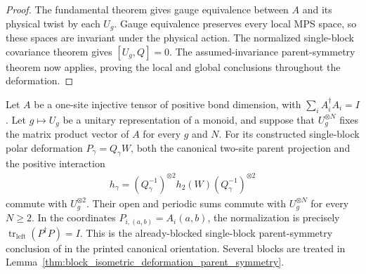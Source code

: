 \begin{proof}
    \leanok
    The fundamental theorem gives gauge equivalence between $A$ and
    its physical twist by each $U_g$. Gauge equivalence preserves every
    local MPS space, so these spaces are invariant under the physical
    action. The normalized single-block covariance theorem gives
    $[U_g,Q]=0$. The assumed-invariance parent-symmetry theorem now
    applies, proving the local and global conclusions throughout the
    deformation.
\end{proof}

\begin{lemma}
    \label{thm:injective_isometric_deformation_parent_symmetry_tp}
    \leanok
    Let $A$ be a one-site injective tensor of positive bond dimension,
    with $\sum_i A_i^\dagger A_i=I$. Let $g\mapsto U_g$ be a unitary
    representation of a monoid, and suppose that $U_g^{\otimes N}$
    fixes the matrix product vector of $A$ for every $g$ and $N$.
    For its constructed single-block polar deformation $P_\gamma=Q_\gamma W$,
    both the canonical two-site parent projection and the positive interaction
    \begin{align*}
        h_\gamma=(Q_\gamma^{-1})^{\otimes2}
        h_2(W)(Q_\gamma^{-1})^{\otimes2}
    \end{align*}
    commute with $U_g^{\otimes2}$. Their open and periodic sums
    commute with $U_g^{\otimes N}$ for every $N\geq2$.
    In the coordinates $P_{i,(a,b)}=A_i(a,b)$, the normalization is
    precisely $\operatorname{tr}_{\mathrm{left}}(P^\dagger P)=I$.
    This is the already-blocked single-block parent-symmetry conclusion
    of \cite[lines~645--676]{Schuch2011Phases} in the printed canonical
    orientation. Several blocks are treated in
    Lemma~\ref{thm:block_isometric_deformation_parent_symmetry}.
\end{lemma}

